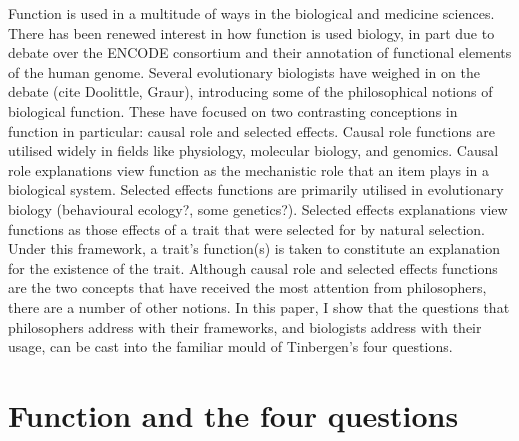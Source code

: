 \documentclass{article}
\begin{document}
Function is used in a multitude of ways in the biological and medicine sciences.
There has been renewed interest in how function is used biology, in part due to debate over the ENCODE consortium and their annotation of functional elements of the human genome.
Several evolutionary biologists have weighed in on the debate (cite Doolittle, Graur), introducing some of the philosophical notions of biological function.
These have focused on two contrasting conceptions in function in particular: causal role and selected effects.
Causal role functions are utilised widely in fields like physiology, molecular biology, and genomics.
Causal role explanations view function as the mechanistic role that an item plays in a biological system.
Selected effects functions are primarily utilised in evolutionary biology (behavioural ecology?, some genetics?).
Selected effects explanations view functions as those effects of a trait that were selected for by natural selection.
Under this framework, a trait's function(s) is taken to constitute an explanation for the existence of the trait.
Although causal role and selected effects functions are the two concepts that have received the most attention from philosophers, there are a number of other notions.
In this paper, I show that the questions that philosophers address with their frameworks, and biologists address with their usage, can be cast into the familiar mould of Tinbergen's four questions.

\section{Function and the four questions}
\label{sec:funct-tinb-four}
\end{document}
